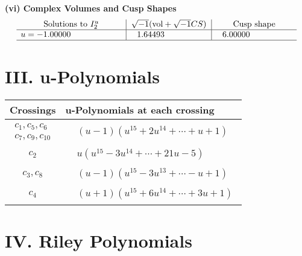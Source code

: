 \documentclass[1p]{elsarticle_modified}
\theoremstyle{definition}
\newcommand{\I}{\sqrt{-1}}
\begin{document}
\newpage\flushleft \textbf{(vi) Complex Volumes and Cusp Shapes}
$$\begin{array}{c|c|c}  
\text{Solutions to }I^u_{2}& \I (\text{vol} + \sqrt{-1}CS) & \text{Cusp shape}\\
 \hline 
\begin{aligned}
u &= -1.00000\phantom{ +0.000000I}\end{aligned}
 & \phantom{-}1.64493\phantom{ +0.000000I} & \phantom{-}6.00000\phantom{ +0.000000I}\\
 \hline 
 \end{array}$$\newpage
\newpage\renewcommand{\arraystretch}{1}
\centering \section*{ III. u-Polynomials}
\begin{tabular}{m{50pt}|m{274pt}}
Crossings & \hspace{64pt}u-Polynomials at each crossing \\
\hline $$\begin{aligned}c_{1},c_{5},c_{6}\\c_{7},c_{9},c_{10}\end{aligned}$$&$\begin{aligned}
&(u-1)(u^{15}+2 u^{14}+\cdots+u+1)
\end{aligned}$\\
\hline $$\begin{aligned}c_{2}\end{aligned}$$&$\begin{aligned}
&u(u^{15}-3 u^{14}+\cdots+21 u-5)
\end{aligned}$\\
\hline $$\begin{aligned}c_{3},c_{8}\end{aligned}$$&$\begin{aligned}
&(u-1)(u^{15}-3 u^{13}+\cdots- u+1)
\end{aligned}$\\
\hline $$\begin{aligned}c_{4}\end{aligned}$$&$\begin{aligned}
&(u+1)(u^{15}+6 u^{14}+\cdots+3 u+1)
\end{aligned}$\\
\hline
\end{tabular}\newpage\renewcommand{\arraystretch}{1}
\centering \section*{ IV. Riley Polynomials}
\end{document}
